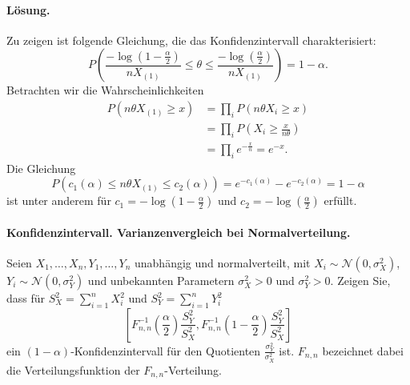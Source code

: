 \paragraph*{Lösung.} Zu zeigen ist folgende Gleichung, die das 
Konfidenzintervall charakterisiert:
\begin{equation*}
    P\left(   \frac{- \log \left( 1 - \frac{\alpha}{2} \right)}{n X_{(1)}} \leq \theta \leq 
    \frac{- \log \left( \frac{\alpha}{2} \right)}{n X_{(1)}} \right) = 1-\alpha.
\end{equation*}
Betrachten wir die Wahrscheinlichkeiten
\begin{align*}
    P \left( n\theta X_{(1)}\geq x \right) &=  \prod_i P \left( n\theta X_i \geq x \right) \\
    &= \prod_i P\left( X_i \geq \frac{x}{n\theta} \right) \\
    &= \prod_i e^{-\frac{x}{n}} = e^{-x}.
\end{align*}
Die Gleichung
\begin{equation*}
    P \left( c_1(\alpha) \leq n\theta X_{(1)} \leq c_2(\alpha) \right) = 
    e^{-c_1(\alpha)} - e^{-c_2(\alpha)} = 1-\alpha
\end{equation*}
ist unter anderem für $c_1 = -\log \left( 1-\frac{\alpha}{2} \right)$ und
$c_2 = -\log \left( \frac{\alpha}{2} \right)$ erfüllt.





\paragraph{Konfidenzintervall. Varianzenvergleich bei Normalverteilung. } 
Seien $X_1,\ldots,X_n,Y_1,\ldots,Y_n$ unabhängig und normalverteilt, mit 
$X_i \sim \mathcal N(0, \sigma^2_X)$, $Y_i \sim \mathcal N(0, \sigma^2_Y)$
und unbekannten Parametern $\sigma^2_X>0$ und $\sigma^2_Y>0$. 
Zeigen Sie, dass für $S^2_X = \sum_{i=1}^{n} X_i^2$ und $S^2_Y = \sum_{i=1}^{n} Y_i^2$
\begin{equation*}
    \left[ F^{-1}_{n,n} \left( \frac{\alpha}{2} \right) \frac{S_Y^2}{S_X^2},
    F^{-1}_{n,n} \left( 1 - \frac{\alpha}{2}  \right) \frac{S_Y^2}{S_X^2}     \right]
\end{equation*}
ein $(1-\alpha)$-Konfidenzintervall für den Quotienten $\frac{\sigma^2_Y}{\sigma^2_X}$ ist.
$F_{n,n}$ bezeichnet dabei die Verteilungsfunktion der $F_{n,n}$-Verteilung.

